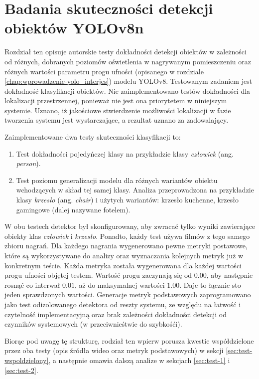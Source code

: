 \chapter{Badania skuteczności detekcji obiektów YOLOv8n}
Rozdział ten opisuje autorskie testy dokładności detekcji obiektów w zależności od różnych, dobranych poziomów oświetlenia w nagrywanym pomieszczeniu oraz różnych wartości parametru progu ufności (opisanego w rozdziale \ref{chap:wprowadzenie-yolo_interjes}) modelu YOLOv8. Testowanym zadaniem jest dokładność klasyfikacji obiektów. Nie zaimplementowano testów dokładności dla lokalizacji przestrzennej, ponieważ nie jest ona priorytetem w niniejszym systemie. Uznano, iż jakościowe stwierdzenie możliwości lokalizacji w fazie tworzenia systemu jest wystarczające, a rezultat uznano za zadowalający. 

Zaimplementowane dwa testy skuteczności klasyfikacji to:
\begin{enumerate}
    \item Test dokładności pojedyńczej klasy na przykładzie klasy \emph{człowiek} (ang. \emph{person}). 
    \item  Test poziomu generalizacji modelu dla różnych wariantów obiektu wchodzących w skład tej samej klasy. Analiza przeprowadzona na przykładzie klasy \emph{krzesło} (ang. \emph{chair}) i użytych wariantów: krzesło kuchenne, krzesło gamingowe (dalej nazywane fotelem). 
\end{enumerate}
W obu testech detektor był skonfigurowany, aby zwracać tylko wyniki zawierające obiekty klas \emph{człowiek} i \emph{krzesło}. Ponadto, każdy test używa filmów z tego samego zbioru nagrań. Dla każdego nagrania wygenerowano pewne metryki postawowe, które są wykorzystywane do analizy oraz wyznaczania kolejnych metryk już w konkretnym teście. Każda metryka została wygenerowana dla każdej wartości progu ufności objętej testem. Wartość progu zaczynają się od $0.00$, aby następnie rosnąć co interwał $0.01$, aż do maksymalnej wartości $1.00$. Daje to łącznie sto jeden sprawdzonych wartości. Generacje metryk podstawowych zaprogramowano jako test odizolowanego detektora od reszty systemu, ze względu na łatwość i czytelność implementacyjną oraz brak zależności dokładności detekcji od czynników systemowych (w przeciwnieśtwie do szybkośći).  

Biorąc pod uwagę tę strukturę, rodział ten wpierw porusza kwestie współdzielone przez oba testy (opis źródła wideo oraz metryk podstawowych) w sekcji \ref{sec:test-wspoldzielony}, a następnie omawia dalszą analize w sekcjach \ref{sec:test-1} i \ref{sec:test-2}.
 
